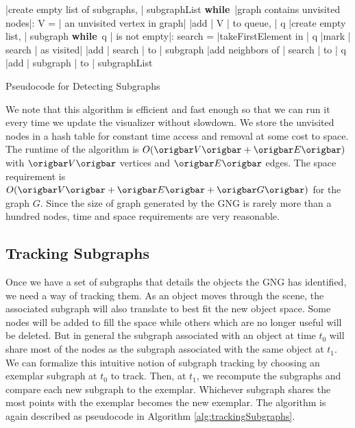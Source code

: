 \documentclass{article}
\renewcommand{\|}{\origbar} %
\renewcommand{\WHILE}{\mbox{{\bf while} }\tab}
\begin{document}
\begin{Algorithm}[h!]
\begin{program}
  |create empty list of subgraphs, | subgraphList 
  \WHILE |graph contains unvisited nodes|:
    V = | an unvisited vertex in graph|
    |add | V | to queue, | q
    |create empty list, | subgraph 
    \WHILE q | is not empty|:
      search = |takeFirstElement in | q 
      |mark | search | as visited|
      |add | search | to | subgraph
      |add neighbors of | search | to | q \untab
  |add | subgraph | to | subgraphList
\end{program}
\caption{Pseudocode for Detecting Subgraphs}
\label{alg:detectingSubgraphs}
\end{Algorithm}

We note that this algorithm is efficient and fast enough so that we can run it every time we update the visualizer without slowdown. We store the unvisited nodes in a hash table for constant time access and removal at some cost to space. The runtime of the algorithm is $O(\|V\|+\|E\|)$ with $\|V\|$ vertices and $\|E\|$ edges. The space requirement is $O(\|V\|+\|E\|+\|G\|)$ for the graph $G$. Since the size of graph generated by the GNG is rarely more than a hundred nodes, time and space requirements are very reasonable.

\subsection{Tracking Subgraphs}

Once we have a set of subgraphs that details the objects the GNG has identified, we need a way of tracking them. As an object moves through the scene, the associated subgraph will also translate to best fit the new object space. Some nodes will be added to fill the space while others which are no longer useful will be deleted. But in general the subgraph associated with an object at time $t_0$ will share most of the nodes as the subgraph associated with the same object at $t_1$. We can formalize this intuitive notion of subgraph tracking by choosing an exemplar subgraph at $t_0$ to track. Then, at $t_1$, we recompute the subgraphs and compare each new subgraph to the exemplar. Whichever subgraph shares the most points with the exemplar becomes the new exemplar. The algorithm is again described as pseudocode in Algorithm \ref{alg:trackingSubgraphs}.
\end{document}
